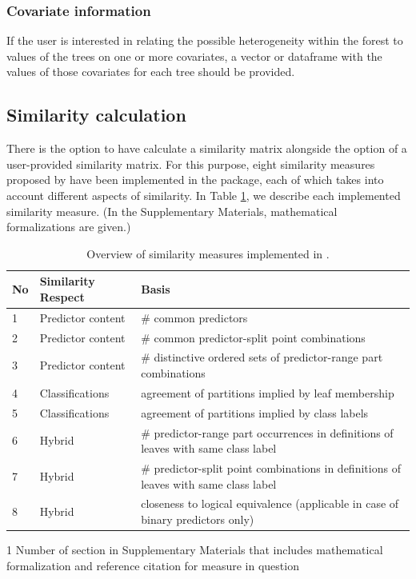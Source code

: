 \subsubsection{Covariate information}
If the user is interested in relating the possible heterogeneity within the forest to values of the trees on one or more covariates, a vector or dataframe with the values of those covariates for each tree should be provided.

\subsection{Similarity calculation}
There is the option to have  calculate a similarity matrix alongside the option of a user-provided similarity matrix. For this purpose, eight similarity measures proposed by \citet{Sies2020} have been implemented in the package, each of which takes into account different aspects of similarity. In Table \ref{tab:00}, we describe each implemented similarity measure. (In the Supplementary Materials, mathematical formalizations are given.)


\begin{table}[t!]
	
	\centering
		\caption{\label{tab:00} Overview of similarity measures implemented in .}
	\begin{threeparttable}
	\begin{tabular}{llp{10cm}}
		\hline
		No\tnote{1} & Similarity Respect           & Basis  \\ \hline
		1 &Predictor content &		$\#$ common predictors  \\
		2 & Predictor content &		$\#$ common predictor-split point combinations \\
		3 &	Predictor content &	$\#$ distinctive ordered sets of predictor-range part combinations \\
		4 &	Classifications &	agreement of partitions implied by leaf membership \\
		5 &	Classifications &	agreement of partitions implied by class labels \\
		6 &	Hybrid &	$\#$ predictor-range part occurrences in definitions of leaves with same class label \\
		7&	Hybrid & $\#$ predictor-split point combinations in definitions of leaves with same class label \\
		8 &	Hybrid & closeness to logical equivalence (applicable in case of binary predictors only)\\
		\hline
	\end{tabular}
\begin{tablenotes}\footnotesize
	\item[1] Number of section in Supplementary Materials that includes mathematical formalization and reference citation for measure in question
\end{tablenotes}

\end{threeparttable}
\end{table}


